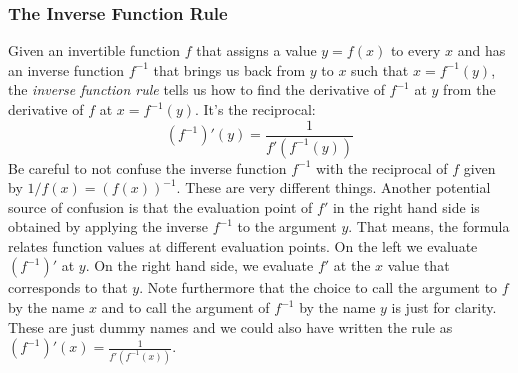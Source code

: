 

\begin{comment}

To the first few (i.e. n = 1,2,3) special cases of this rule with SageMath, use:

x    = SR.var('x')
f    = function('f')
g    = function('g')
h(x) = f(g(x))
h1   = diff(h,  x)
h2   = diff(h1, x)
h3   = diff(h2, x)
h1, h2, h3

which gives:

(x |--> D[0](f)(g(x))*diff(g(x), x),
 x |--> D[0, 0](f)(g(x))*diff(g(x), x)^2 + D[0](f)(g(x))*diff(g(x), x, x),
 x |--> D[0, 0, 0](f)(g(x))*diff(g(x), x)^3 + 3*D[0, 0](f)(g(x))*diff(g(x), x)*diff(g(x), x, x) + D[0](f)(g(x))*diff(g(x), x, x, x))

Let's simplify that notationally:

n=2: f''(g) * (g')^2 +  f'(g) * g''    verify!





\end{comment}

\subsubsection{The Inverse Function Rule}
Given an invertible function $f$ that assigns a value $y = f(x)$ to every $x$ and has an inverse function  $f^{-1}$ that brings us back from $y$ to $x$ such that $x = f^{-1}(y)$, the \emph{inverse function rule} tells us how to find the derivative of  $f^{-1}$ at $y$ from the derivative of $f$ at $x = f^{-1}(y)$. It's the reciprocal:
\begin{equation}
 (f^{-1})'(y) = \frac{1}{f'(f^{-1}(y))}
\end{equation}
Be careful to not confuse the inverse function $f^{-1}$ with the reciprocal of $f$ given by $1/f(x) = (f(x))^{-1}$. These are very different things. Another potential source of confusion is that the evaluation point of $f'$ in the right hand side is obtained by applying the inverse $f^{-1}$ to the argument $y$. That means, the formula relates function values at different evaluation points. On the left we evaluate $(f^{-1})'$ at $y$. On the right hand side, we evaluate $f'$ at the $x$ value that corresponds to that $y$. Note furthermore that the choice to call the argument to $f$ by the name $x$ and to call the argument of $f^{-1}$ by the name $y$ is just for clarity. These are just dummy names and we could also have written the rule as $(f^{-1})'(x) = \frac{1}{f'(f^{-1}(x))}$. 

